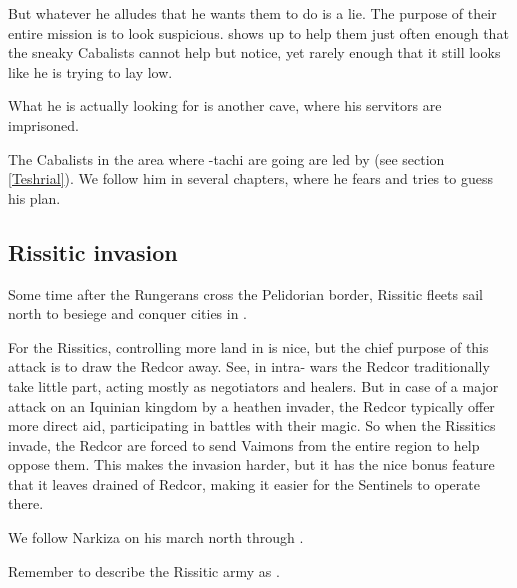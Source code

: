 But whatever he alludes that he wants them to do is a lie. The purpose of their entire mission is to look suspicious. \Ishnaruchaefir{} shows up to help them just often enough that the sneaky Cabalists cannot help but notice, yet rarely enough that it still looks like he is trying to lay low. 

What he is actually looking for is another cave, where his servitors are imprisoned. 

The Cabalists in the area where \Shilred-tachi are going are led by \Teshrial{} (see section \ref{Teshrial}). We follow him in several chapters, where he fears \Ishnaruchaefir{} and tries to guess his plan. 






\subsection{Rissitic invasion}
Some time after the Rungerans cross the Pelidorian border, Rissitic fleets sail north to besiege and conquer cities in \Scyrum. 


For the Rissitics, controlling more land in \Velcad{} is nice, but the chief purpose of this attack is to draw the Redcor away. See, in intra-\Velcadian{} wars the Redcor traditionally take little part, acting mostly as negotiators and healers. But in case of a major attack on an Iquinian kingdom by a heathen invader, the Redcor typically offer more direct aid, participating in battles with their magic. So when the Rissitics invade, the Redcor are forced to send Vaimons from the entire region to help oppose them. 
This makes the invasion harder, but it has the nice bonus feature that it leaves \Malcur drained of Redcor, making it easier for the Sentinels to operate there. 

We follow Narkiza on his march north through \Scyrum. 



Remember to describe the Rissitic army as .







